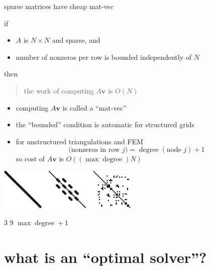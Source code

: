 \documentclass[hide notes,intlimits,usenames,dvipsnames]{beamer}
\newcommand{\bv}{\mathbf{v}}
\begin{document}
\begin{frame}{sparse matrices have cheap mat-vec}

if
\begin{itemize}
\item $A$ is $N\times N$ and sparse, and
\item number of nonzeros per row is bounded independently of $N$
\end{itemize}
then
\begin{quote}
the work of computing $A \bv$ is $O(N)$
\end{quote}

\begin{itemize}
\item computing $A \bv$ is called a ``mat-vec''
\item the ``bounded'' condition is automatic for structured grids
\item for unstructured triangulations and FEM
   $$\text{(nonzeros in row } j) = \operatorname{degree}(\text{node } j) + 1$$
so cost of $A\bv$ is $O((\max \operatorname{degree}) N)$
\end{itemize}

\bigskip
\begin{center}
\includegraphics[width=0.5\textwidth]{figs/spythree}

\tiny

\qquad $3$ \qquad\qquad\qquad\qquad $9$ \qquad\qquad\quad $\max \operatorname{degree} + 1$
\end{center}
\end{frame}


\section{what is an ``optimal solver''?}
\end{document}

